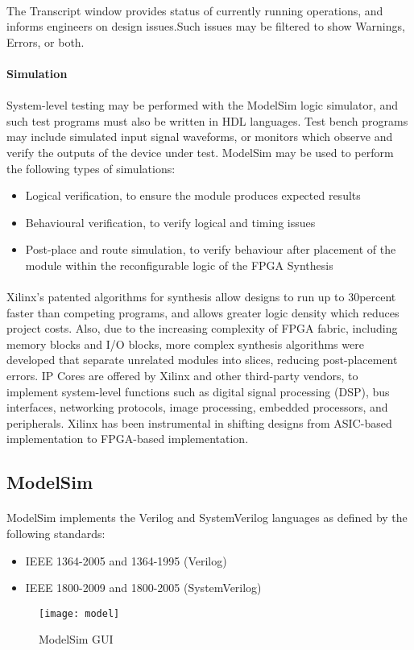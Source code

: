 \documentclass[14pt]{report}
\begin{document}
{\paragraph{} The Transcript window provides status of currently running operations, and informs engineers on design issues.Such issues may be filtered to show Warnings, Errors, or both.\\
\\
\textbf{Simulation}
\paragraph{} System-level testing may be performed with the ModelSim logic simulator, and such test programs must also be written in HDL languages. Test bench programs may include simulated input signal waveforms, or monitors which observe and verify the outputs of the device under test.
ModelSim may be used to perform the following types of simulations:
\begin{itemize}
\item Logical verification, to ensure the module produces expected results
\item Behavioural verification, to verify logical and timing issues
\item Post-place and route simulation, to verify behaviour after placement of the module within the reconfigurable logic of the FPGA  Synthesis
\end{itemize}
\paragraph{} Xilinx's patented algorithms for synthesis allow designs to run up to 30percent faster than competing programs, and allows greater logic density which reduces project costs. Also, due to the increasing complexity of FPGA fabric, including memory blocks and I/O blocks, more complex synthesis algorithms were developed that separate unrelated modules into slices, reducing post-placement errors. IP Cores are offered by Xilinx and other third-party vendors, to implement system-level functions such as digital signal processing (DSP), bus interfaces, networking protocols, image processing, embedded processors, and peripherals. Xilinx has been instrumental in shifting designs from ASIC-based implementation to FPGA-based implementation.
\subsection{ModelSim}
\paragraph{} ModelSim implements the Verilog and SystemVerilog languages as defined by the following
standards:\\
\begin{itemize}
\item IEEE 1364-2005 and 1364-1995 (Verilog)
\item IEEE 1800-2009 and 1800-2005 (SystemVerilog)
\end{itemize}
\begin{figure}[ht]
\centering
\texttt{[image: model]}
\caption{ModelSim GUI}
\end{figure}
}
\end{document}
